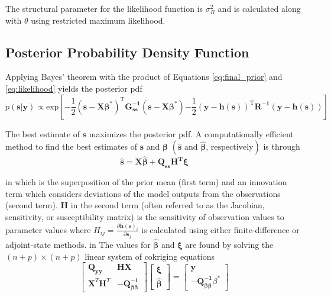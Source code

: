 \documentclass[11pt,oneside,onecolumn]{usgsreport}
\begin{document}
\begin{appendix}
\begin{bibunit}
The structural parameter for the likelihood function is $\sigma_{R}^{2}$
and is calculated along with $\theta$ using restricted maximum likelihood.


\subsection{Posterior Probability Density Function}

Applying Bayes' theorem with the product of Equations \ref{eq:final_prior}
and \ref{eq:likelihood} yields the posterior pdf
\begin{equation}
p(\mathbf{s|y})\propto\mathrm{exp\left[\mathbf{-}\frac{1}{2}(\mathbf{s-X\beta}^{*})^{T}\mathbf{G_{\mathbf{ss}}^{-1}}(\mathbf{s-X\beta^{*}})\mathbf{-}\frac{1}{2}\left(\mathbf{y-h}(\mathbf{s})\right)^{T}\mathbf{R^{-1}\left(\mathbf{y-h}(\mathbf{s})\right)}\right]}\label{eq:posterior}
\end{equation}


The best estimate of $\mathbf{s}$ maximizes the posterior pdf. A
computationally efficient method to find the best estimates of $\mathbf{s}$
and $\mathbf{\beta}$ $\left(\hat{\mathbf{s}}\mbox{ and }\mathbf{\hat{\beta}}\mbox{, respectively}\right)$
is through
\begin{equation}
\hat{\mathbf{s}}=\mathbf{X\hat{\beta}+Q_{ss}H^{\mathbf{T}}\xi}\label{eq:shat}
\end{equation}

 in
which is the superposition of the prior mean (first term) and an innovation
term which considers deviations of the model outputs from the observations
(second term). $\mathbf{H}$ in the second term (often referred to
as the Jacobian, sensitivity, or susceptibility matrix) is the sensitivity
of observation values to parameter values $\mbox{where }H_{ij}=\frac{\partial\mathbf{h}\left(\mathbf{s}\right)_{i}}{\partial\mathbf{s}_{j}}$
is calculated using either finite-difference or adjoint-state methods.
 in
The values for $\mathbf{\hat{\beta}}$ and $\mathbf{\xi}$ are found
by solving the $(n+p)\times(n+p)$ linear system of cokriging equations
\begin{equation}
\left[\begin{array}{cc}
\mathbf{Q_{yy}} & \mathbf{HX}\\
\mathbf{X}^{T}\mathbf{H}^{T} & \mathbf{-}\mathbf{Q_{\beta\beta}^{-1}}
\end{array}\right]\left[\begin{array}{c}
\mathbf{\xi}\\
\mathbf{\hat{\beta}}
\end{array}\right]=\left[\begin{array}{c}
\mathbf{y}\\
\mathbf{-}\mathbf{Q_{\beta\beta}^{-1}}\beta^{*}
\end{array}\right]\label{eq:cokriging}
\end{equation}


\end{bibunit}
\end{appendix}
\end{document}
